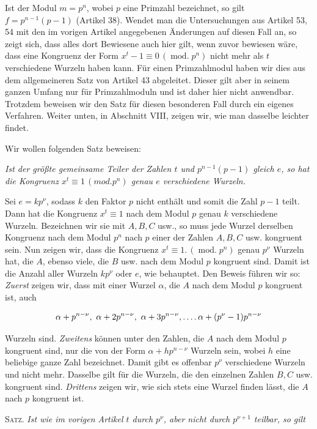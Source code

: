 Ist der Modul $m=p^n$, wobei $p$ eine Primzahl bezeichnet, so gilt $f=p^{n-1}(p-1)$ (Artikel 38). Wendet man die Untersuchungen aus Artikel 53, 54 mit den im vorigen Artikel angegebenen Änderungen auf diesen Fall an, so zeigt sich, dass alles dort Bewiesene auch hier gilt, wenn zuvor bewiesen wäre, dass eine Kongruenz der Form $x^t-1\equiv0\,(\operatorname{mod.}p^n)$ nicht mehr als $t$ verschiedene Wurzeln haben kann. Für einen Primzahlmodul haben wir dies aus dem allgemeineren Satz von Artikel 43 abgeleitet. Dieser gilt aber in seinem ganzen Umfang nur für Primzahlmoduln und ist daher hier nicht anwendbar. Trotzdem beweisen wir den Satz für diesen besonderen Fall durch ein eigenes Verfahren. Weiter unten, in Abschnitt VIII, zeigen wir, wie man dasselbe leichter findet.

Wir wollen folgenden Satz beweisen:

\emph{Ist der größte gemeinsame Teiler der Zahlen $t$ und $p^{n-1}(p-1)$ gleich $e$, so hat die Kongruenz $x^t\equiv1\,(\mathit{mod.}p^n)$ genau $e$ verschiedene Wurzeln.}

Sei $e=kp^{\nu}$, sodass $k$ den Faktor $p$ nicht enthält und somit die Zahl $p-1$
teilt. Dann hat die Kongruenz $x^t\equiv1$ nach dem Modul $p$ genau $k$ verschiedene Wurzeln. Bezeichnen wir sie mit $A,B,C$ usw., so muss jede Wurzel derselben Kongruenz nach dem Modul $p^n$ nach $p$ einer der Zahlen $A,B,C$ usw. kongruent sein. Nun zeigen wir, dass die Kongruenz $x^t\equiv1.\,(\operatorname{mod.}p^n)$ genau $p^{\nu}$ Wurzeln hat, die $A$, ebenso viele, die $B$ usw. nach dem Modul $p$ kongruent sind. Damit ist die Anzahl aller Wurzeln $kp^{\nu}$ oder $e$, wie behauptet. Den Beweis führen wir so: \emph{Zuerst} zeigen wir, dass mit einer Wurzel $\alpha$, die $A$ nach dem Modul $p$ kongruent ist, auch

\[\alpha+p^{n-\nu},\ \alpha+2p^{n-\nu},\ \alpha+3p^{n-\nu},\mathinner{.\,.\,.\,.}\alpha+(p^{\nu}-1)p^{n-\nu}\]

Wurzeln sind. \emph{Zweitens} können unter den Zahlen, die $A$ nach dem Modul $p$ kongruent sind, nur die von der Form $\alpha+hp^{n-\nu}$ Wurzeln sein, wobei $h$ eine beliebige ganze Zahl bezeichnet. Damit gibt es offenbar $p^{\nu}$ verschiedene Wurzeln und nicht mehr. Dasselbe gilt für die Wurzeln, die den einzelnen Zahlen $B,C$ usw. kongruent sind. \emph{Drittens} zeigen wir, wie sich stets eine Wurzel finden lässt, die $A$ nach $p$ kongruent ist.

\textsc{Satz.} \emph{Ist wie im vorigen Artikel $t$ durch $p^{\nu}$, aber nicht durch $p^{\nu+1}$ teilbar, so gilt}

